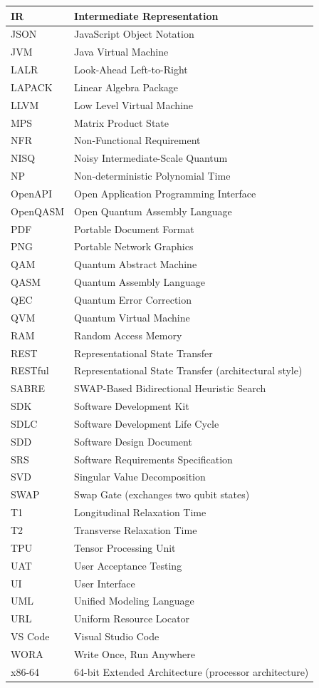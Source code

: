 \begin{longtable}{|p{3cm}|p{10cm}|}
\hline
IR & Intermediate Representation \\
\hline
JSON & JavaScript Object Notation \\
\hline
JVM & Java Virtual Machine \\
\hline
LALR & Look-Ahead Left-to-Right \\
\hline
LAPACK & Linear Algebra Package \\
\hline
LLVM & Low Level Virtual Machine \\
\hline
MPS & Matrix Product State \\
\hline
NFR & Non-Functional Requirement \\
\hline
NISQ & Noisy Intermediate-Scale Quantum \\
\hline
NP & Non-deterministic Polynomial Time \\
\hline
OpenAPI & Open Application Programming Interface \\
\hline
OpenQASM & Open Quantum Assembly Language \\
\hline
PDF & Portable Document Format \\
\hline
PNG & Portable Network Graphics \\
\hline
QAM & Quantum Abstract Machine \\
\hline
QASM & Quantum Assembly Language \\
\hline
QEC & Quantum Error Correction \\
\hline
QVM & Quantum Virtual Machine \\
\hline
RAM & Random Access Memory \\
\hline
REST & Representational State Transfer \\
\hline
RESTful & Representational State Transfer (architectural style) \\
\hline
SABRE & SWAP-Based Bidirectional Heuristic Search \\
\hline
SDK & Software Development Kit \\
\hline
SDLC & Software Development Life Cycle \\
\hline
SDD & Software Design Document \\
\hline
SRS & Software Requirements Specification \\
\hline
SVD & Singular Value Decomposition \\
\hline
SWAP & Swap Gate (exchanges two qubit states) \\
\hline
T1 & Longitudinal Relaxation Time \\
\hline
T2 & Transverse Relaxation Time \\
\hline
TPU & Tensor Processing Unit \\
\hline
UAT & User Acceptance Testing \\
\hline
UI & User Interface \\
\hline
UML & Unified Modeling Language \\
\hline
URL & Uniform Resource Locator \\
\hline
VS Code & Visual Studio Code \\
\hline
WORA & Write Once, Run Anywhere \\
\hline
x86-64 & 64-bit Extended Architecture (processor architecture) \\
\hline


\end{longtable}
